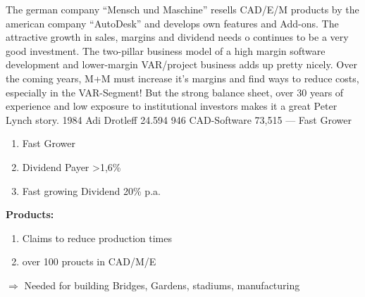 \documentclass{company_analysis}
\begin{document}


\story
    {The german company \enquote{Mensch und Maschine} resells CAD/E/M
    products by the american company \enquote{AutoDesk} and develops
    own features and Add-ons. The attractive growth in sales, margins
    and dividend needs o continues to be a very good investment. The
    two-pillar business model of a high margin software development and
    lower-margin VAR/project business adds up pretty nicely. Over the
    coming years, M+M must increase it's margins and find ways to reduce
    costs, especially in the VAR-Segment! But the strong balance sheet,
    over 30 years of experience and low exposure to institutional investors
    makes it a great Peter Lynch story.}\hfill
\infosection
    {1984}
    {Adi Drotleff}
    {24.594}
    {946}
    {CAD-Software}
    {73,515}
    {---}
    {Fast Grower}
    {\begin{enumerate}[leftmargin=0.8em, labelsep=0.2em]
        \item Fast Grower
        \item Dividend Payer \textgreater 1,6\%
        \item Fast growing Dividend 20\% p.a.
    \end{enumerate}
    }



\begin{minipage}{.6\linewidth}
    \faArchive\space\textbf{Products:}
    \begin{enumerate}
        \item Claims to reduce production times
        \item over 100 proucts in CAD/M/E
    \end{enumerate}
    $\Rightarrow$ Needed for building Bridges, Gardens, stadiums, manufacturing
\end{minipage}
\end{document}
